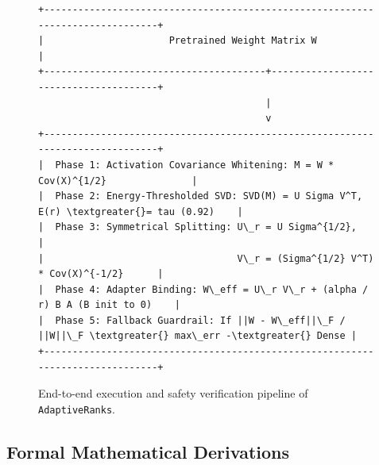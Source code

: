 \begin{figure}[t]
\centering
\begin{verbatim}
+-------------------------------------------------------------------------------+
|                      Pretrained Weight Matrix W                               |
+---------------------------------------+---------------------------------------+
                                        |
                                        v
+-------------------------------------------------------------------------------+
|  Phase 1: Activation Covariance Whitening: M = W * Cov(X)^{1/2}               |
|  Phase 2: Energy-Thresholded SVD: SVD(M) = U Sigma V^T, E(r) \textgreater{}= tau (0.92)    |
|  Phase 3: Symmetrical Splitting: U\_r = U Sigma^{1/2},                         |
|                                  V\_r = (Sigma^{1/2} V^T) * Cov(X)^{-1/2}      |
|  Phase 4: Adapter Binding: W\_eff = U\_r V\_r + (alpha / r) B A (B init to 0)    |
|  Phase 5: Fallback Guardrail: If ||W - W\_eff||\_F / ||W||\_F \textgreater{} max\_err -\textgreater{} Dense |
+-------------------------------------------------------------------------------+
\end{verbatim}
\caption{End-to-end execution and safety verification pipeline of \texttt{AdaptiveRanks}.}
\end{figure}

\subsection{Formal Mathematical Derivations}

